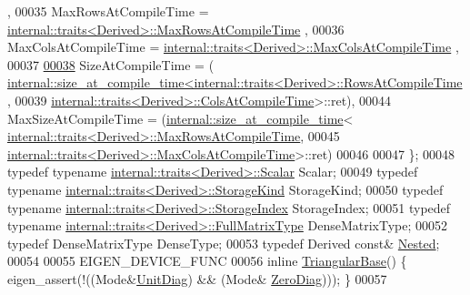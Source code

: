 \begin{DoxyCode}
      ,
00035       MaxRowsAtCompileTime = \hyperlink{struct_eigen_1_1internal_1_1traits}{internal::traits<Derived>::MaxRowsAtCompileTime}
      ,
00036       MaxColsAtCompileTime = \hyperlink{struct_eigen_1_1internal_1_1traits}{internal::traits<Derived>::MaxColsAtCompileTime}
      ,
00037       
\hyperlink{group___core___module_a83edbc629b03700f716a30e7105e1de6ae21ac85ecfd10a6bae00ec3608f42b97}{00038}       SizeAtCompileTime = (
      \hyperlink{struct_eigen_1_1internal_1_1size__at__compile__time}{internal::size\_at\_compile\_time<internal::traits<Derived>::RowsAtCompileTime}
      ,
00039                                                    
      \hyperlink{struct_eigen_1_1internal_1_1traits}{internal::traits<Derived>::ColsAtCompileTime}>::ret),
00044       MaxSizeAtCompileTime = (\hyperlink{struct_eigen_1_1internal_1_1size__at__compile__time}{internal::size\_at\_compile\_time}<
      \hyperlink{struct_eigen_1_1internal_1_1traits}{internal::traits<Derived>::MaxRowsAtCompileTime},
00045                                                    
      \hyperlink{struct_eigen_1_1internal_1_1traits}{internal::traits<Derived>::MaxColsAtCompileTime}>::ret)
00046         
00047     \};
00048     \textcolor{keyword}{typedef} \textcolor{keyword}{typename} \hyperlink{struct_eigen_1_1internal_1_1traits}{internal::traits<Derived>::Scalar} Scalar;
00049     \textcolor{keyword}{typedef} \textcolor{keyword}{typename} \hyperlink{struct_eigen_1_1internal_1_1traits}{internal::traits<Derived>::StorageKind} 
      StorageKind;
00050     \textcolor{keyword}{typedef} \textcolor{keyword}{typename} \hyperlink{struct_eigen_1_1internal_1_1traits}{internal::traits<Derived>::StorageIndex} 
      StorageIndex;
00051     \textcolor{keyword}{typedef} \textcolor{keyword}{typename} \hyperlink{struct_eigen_1_1internal_1_1traits}{internal::traits<Derived>::FullMatrixType} 
      DenseMatrixType;
00052     \textcolor{keyword}{typedef} DenseMatrixType DenseType;
00053     \textcolor{keyword}{typedef} Derived \textcolor{keyword}{const}& \hyperlink{group___core___module_class_eigen_1_1_self_adjoint_view}{Nested};
00054 
00055     EIGEN\_DEVICE\_FUNC
00056     \textcolor{keyword}{inline} \hyperlink{group___core___module_class_eigen_1_1_triangular_base}{TriangularBase}() \{ eigen\_assert(!((Mode&\hyperlink{group__enums_gga39e3366ff5554d731e7dc8bb642f83cdaddb72f888ac85d5a1c52333e54f9374b}{UnitDiag}) && (Mode&
      \hyperlink{group__enums_gga39e3366ff5554d731e7dc8bb642f83cda884ff7240392e85aa6e4b3c957e36483}{ZeroDiag}))); \}
00057 

\end{DoxyCode}
